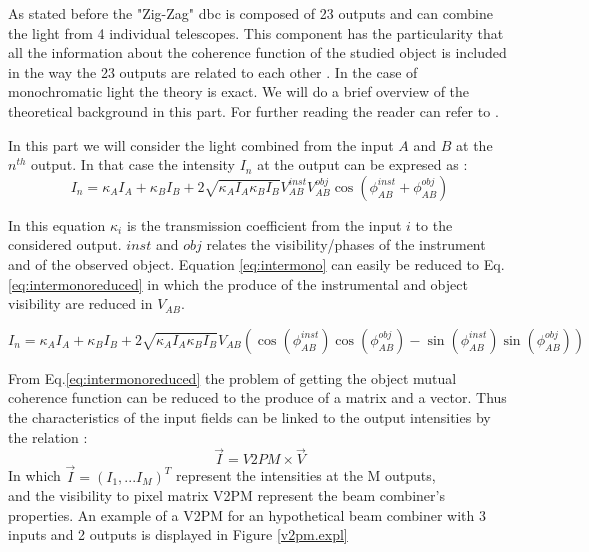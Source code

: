 As stated before the "Zig-Zag" \gls{dbc} is composed of 23 outputs and can combine the light from 4 individual telescopes. This component has the particularity that all the information about the coherence function of the studied object is included in the way the 23 outputs are related to each other \cite{tatulli}. In the case of monochromatic light the theory is exact. We will do a brief overview of the theoretical background in this part. For further reading the reader can refer to \cite{tatulli, saviauk, Diener2017}.

In this part we will consider the light combined from the input $A$ and $B$ at the $n^{th}$ output. In that case the intensity $I_n$ at the output can be expresed as :
\begin{equation}\label{eq:intermono}
 I_n = \kappa_AI_A+\kappa_BI_B+2\sqrt{\kappa_AI_A\kappa_BI_B}V_{AB}^{inst}V_{AB}^{obj}\cos(\phi_{AB}^{inst}+\phi_{AB}^{obj})
\end{equation}

In this equation $\kappa_i$ is the transmission coefficient from the input $i$ to the considered output. $inst$ and $obj$ relates the visibility/phases of the instrument and of the observed object. Equation \ref{eq:intermono} can easily be reduced to Eq.\ref{eq:intermonoreduced} in which the produce of the instrumental and object visibility are reduced in $V_{AB}$.

\begin{equation}\label{eq:intermonoreduced}
  I_n = \kappa_AI_A+\kappa_BI_B+2\sqrt{\kappa_AI_A\kappa_BI_B}V_{AB}\left(\cos(\phi_{AB}^{inst})\cos(\phi_{AB}^{obj})-\sin(\phi_{AB}^{inst})\sin(\phi_{AB}^{obj})\right)
\end{equation}

From Eq.\ref{eq:intermonoreduced} the problem of getting the object mutual coherence function can be reduced to the produce of a matrix and a vector. 
Thus the
characteristics of the input fields can be linked to the output
intensities by the relation :
\begin{equation}
  \vec{I} = V2PM \times \vec{V}
\end{equation}
In which $\vec{I} = (I_1,...I_M)^T$ represent the intensities at the M outputs, \\ 
and the visibility to pixel matrix V2PM represent the beam combiner's properties. An example of a V2PM for an hypothetical beam combiner
with 3 inputs and 2 outputs is displayed in Figure \ref{v2pm.expl}


